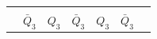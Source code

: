 \documentclass[a4paper,14pt]{article}
\begin{document}
\begin{table}[H]
\begin{center}
\begin{tabular}{cccccccccc}
			                                                  &                                 &              \multicolumn{2}{c}{}               &              \multicolumn{2}{c}{}              &              \multicolumn{2}{c}{}              &                                 &                        \\
			              \multicolumn{1}{l}{}                & \multicolumn{1}{l}{$\bar{Q}_3$} & \multicolumn{2}{l}{$Q_3$}                       & \multicolumn{2}{l}{$\bar{Q}_3$}                & \multicolumn{2}{l}{$Q_3$}                      & \multicolumn{1}{l}{$\bar{Q}_3$} &  \multicolumn{1}{l}{}
		\end{tabular}
	\end{center}
\end{table}

\end{document}

